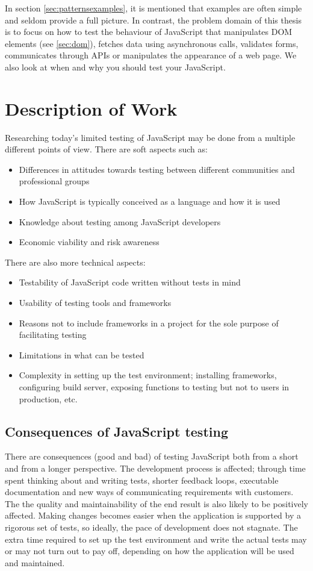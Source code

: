 \documentclass[11pt]{article}
\begin{document}
In section \ref{sec:patternsexamples}, it is mentioned that examples are often simple and seldom provide a full picture. In contrast, the problem domain of this thesis is to focus on how to test the behaviour of JavaScript that manipulates DOM elements (see \ref{sec:dom}), fetches data using asynchronous calls, validates forms, communicates through APIs or manipulates the appearance of a web page. We also look at when and why you should test your JavaScript.

\section{Description of Work}

Researching today's limited testing of JavaScript may be done from a multiple different points of view. There are soft aspects such as:
\begin{itemize}
\item Differences in attitudes towards testing between different communities and professional groups
\item How JavaScript is typically conceived as a language and how it is used
\item Knowledge about testing among JavaScript developers
\item Economic viability and risk awareness
\end{itemize}

There are also more technical aspects:
\begin{itemize}
\item Testability of JavaScript code written without tests in mind
\item Usability of testing tools and frameworks
\item Reasons not to include frameworks in a project for the sole purpose of facilitating testing
\item Limitations in what can be tested
\item Complexity in setting up the test environment; installing frameworks, configuring build server, exposing functions to testing but not to users in production, etc.
\end{itemize}

\subsection{Consequences of JavaScript testing}

There are consequences (good and bad) of testing JavaScript both from a short and from a longer perspective. The development process is affected; through time spent thinking about and writing tests, shorter feedback loops, executable documentation and new ways of communicating requirements with customers. The the quality and maintainability of the end result is also likely to be positively affected. Making changes becomes easier when the application is supported by a rigorous set of tests, so ideally, the pace of development does not stagnate. The extra time required to set up the test environment and write the actual tests may or may not turn out to pay off, depending on how the application will be used and maintained.
\end{document}
